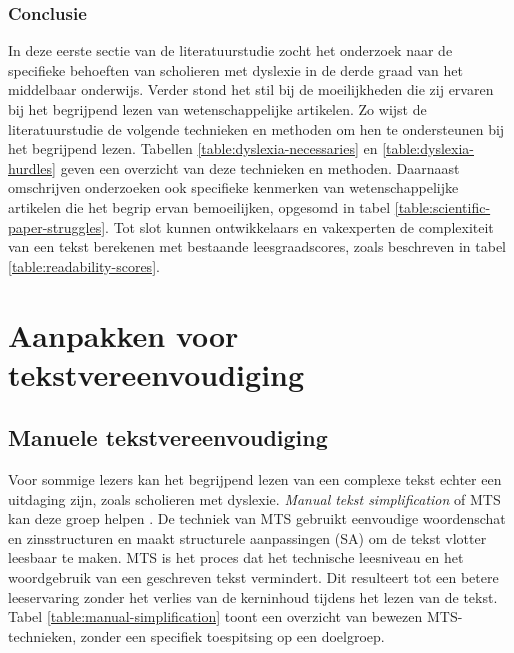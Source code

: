 \subsubsection{Conclusie}

In deze eerste sectie van de literatuurstudie zocht het onderzoek naar de specifieke behoeften van scholieren met dyslexie in de derde graad van het middelbaar onderwijs. Verder stond het stil bij de moeilijkheden die zij ervaren bij het begrijpend lezen van wetenschappelijke artikelen. Zo wijst de literatuurstudie de volgende technieken en methoden om hen te ondersteunen bij het begrijpend lezen. Tabellen \ref{table:dyslexia-necessaries} en \ref{table:dyslexia-hurdles} geven een overzicht van deze technieken en methoden. Daarnaast omschrijven onderzoeken ook specifieke kenmerken van wetenschappelijke artikelen die het begrip ervan bemoeilijken, opgesomd in tabel \ref{table:scientific-paper-struggles}. Tot slot kunnen ontwikkelaars en vakexperten de complexiteit van een tekst berekenen met bestaande leesgraadscores, zoals beschreven in tabel \ref{table:readability-scores}.

\section{Aanpakken voor tekstvereenvoudiging}

\subsection{Manuele tekstvereenvoudiging}

Voor sommige lezers kan het begrijpend lezen van een complexe tekst echter een uitdaging zijn, zoals scholieren met dyslexie. \textit{Manual tekst simplification} of MTS kan deze groep helpen \autocite{Siddharthan2014}. De techniek van MTS gebruikt eenvoudige woordenschat en zinsstructuren en maakt structurele aanpassingen (SA) om de tekst vlotter leesbaar te maken. MTS is het proces dat het technische leesniveau en het woordgebruik van een geschreven tekst vermindert. Dit resulteert tot een betere leeservaring zonder het verlies van de kerninhoud tijdens het lezen van de tekst. Tabel \ref{table:manual-simplification} toont een overzicht van bewezen MTS-technieken, zonder een specifiek toespitsing op een doelgroep.

